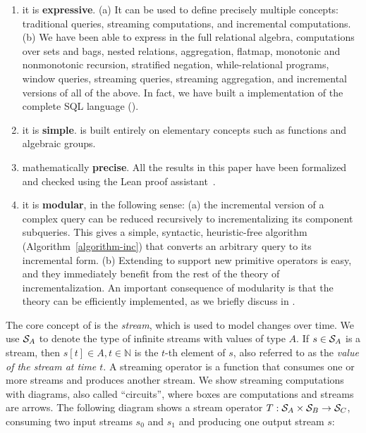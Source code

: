 \begin{enumerate}[nosep, leftmargin=0pt, itemindent=0.5cm, label=\textbf{(\arabic{*})}]
\item it is \textbf{expressive}.  (a) It can be used to define
precisely multiple concepts: traditional queries, streaming computations, and incremental
computations.  (b) We have been able to express in \dbsp the full
relational algebra, computations over sets and bags,
nested relations, aggregation, flatmap, monotonic and nonmonotonic
recursion, stratified negation, while-relational programs, window queries,
streaming queries, streaming aggregation, and incremental versions of all
of the above.  In fact, we have built a \dbsp implementation of the
complete SQL language ().
\item it is \textbf{simple}.
\dbsp is built entirely on elementary concepts such as functions and algebraic groups.
\item mathematically \textbf{precise}.  All the results in this paper have been
formalized and checked using the Lean
proof assistant~\cite{moura-cade15}.
\item it is \textbf{modular}, in the following sense:
(a) the incremental version of a complex query can be reduced
recursively to incrementalizing its component subqueries.
This gives a simple, syntactic,
heuristic-free algorithm (Algorithm~\ref{algorithm-inc})
that converts an arbitrary \dbsp query to its incremental form.
(b) Extending \dbsp to support new primitive operators is easy,
and they immediately benefit from the rest of the theory of
incrementalization.
An important consequence of modularity is that the theory
can be efficiently implemented, as we
briefly discuss in .
\end{enumerate}



The core concept of \dbsp is the \emph{stream}, which is used to model changes
over time. We use $\mathcal{S}_{A}$ to denote the type of infinite streams with values of
type $A$. If $s \in \mathcal{S}_{A}$ is a stream,
then $s[t] \in A, t \in \mathbb{N}$ is the $t$-th element of $s$, also referred to as the \emph{value of the stream at time $t$}.
A streaming operator is a function that
consumes one or more streams and produces another stream.  We show
streaming computations with diagrams, also called ``circuits'',
where boxes are computations and streams are arrows.  The following diagram
shows a stream operator $T: \mathcal{S}_{A} \times \mathcal{S}_{B} \to \mathcal{S}_{C}$,
consuming two input streams $s_0$ and $s_1$
and producing one output stream $s$:

